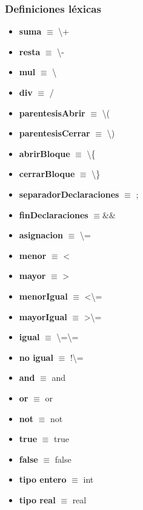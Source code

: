 \documentclass[11pt]{article}
\begin{document}
        \subsubsection*{Definiciones léxicas}
        \begin{itemize}
            \item \textbf{suma }$\equiv$ \textbackslash+
            \item \textbf{resta }$\equiv$ \textbackslash-
            \item \textbf{mul }$\equiv$ \textbackslash*
            \item \textbf{div }$\equiv$ /
            \item \textbf{parentesisAbrir }$\equiv$ \textbackslash(
            \item \textbf{parentesisCerrar }$\equiv$ \textbackslash)
            \item \textbf{abrirBloque }$\equiv$ \textbackslash\{
            \item \textbf{cerrarBloque }$\equiv$ \textbackslash\}
            \item \textbf{separadorDeclaraciones }$\equiv$ ;
            \item \textbf{finDeclaraciones }$\equiv \&\& $
            \item \textbf{asignacion }$\equiv$ \textbackslash=
            \item \textbf{menor }$\equiv$ \textless
            \item \textbf{mayor }$\equiv$ \textgreater
            \item \textbf{menorIgual }$\equiv$ \textless\textbackslash=
            \item \textbf{mayorIgual }$\equiv$ \textgreater\textbackslash=
            \item \textbf{igual }$\equiv$ \textbackslash=\textbackslash=
            \item \textbf{no igual }$\equiv$ !\textbackslash=
            \item \textbf{and }$\equiv$ and
            \item \textbf{or }$\equiv$ or
            \item \textbf{not }$\equiv$ not
            \item \textbf{true }$\equiv$ true
            \item \textbf{false }$\equiv$ false
            \item \textbf{tipo entero }$\equiv$ int
            \item \textbf{tipo real }$\equiv$ real

\end{itemize}
\end{document}
